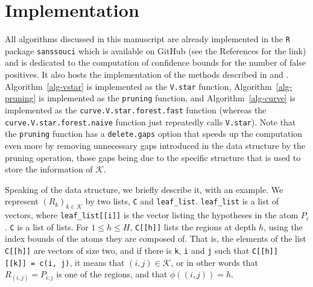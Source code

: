 \documentclass[
  11pt,
  a4paper,
]{article}
\theoremstyle{plain}
\theoremstyle{definition}
\theoremstyle{plain}
\theoremstyle{definition}
\theoremstyle{plain}
\theoremstyle{remark}
\begin{document}
\section{Implementation}\label{sec-implementation}

All algorithms discussed in this manuscript are already implemented in
the \texttt{R} \citep{R-base} package \texttt{sanssouci}
\citep{sanssouci} which is available on GitHub (see the References for
the link) and is dedicated to the computation of confidence bounds for
the number of false positives. It also hosts the implementation of the
methods described in \citet{MR4124323} and
\citet{10.1093/bioinformatics/btac693}.  Algorithm~\ref{alg-vstar}  is
implemented as the \texttt{V.star} function,
 Algorithm~\ref{alg-pruning}  is implemented as the \texttt{pruning}
function, and  Algorithm~\ref{alg-curve}  is implemented as the
\texttt{curve.V.star.forest.fast} function (whereas the
\texttt{curve.V.star.forest.naive} function just repeatedly calls
\texttt{V.star}). Note that the \texttt{pruning} function has a
\texttt{delete.gaps} option that speeds up the computation even more by
removing unnecessary gaps introduced in the data structure by the
pruning operation, those gaps being due to the specific structure that
is used to store the information of \(\mathcal{K}\).

Speaking of the data structure, we briefly describe it, with an example.
We represent \((R_k)_{k\in\mathcal{K}}\) by two lists, \texttt{C} and
\texttt{leaf\_list}. \texttt{leaf\_list} is a list of vectors, where
\texttt{leaf\_list{[}{[}i{]}{]}} is the vector listing the hypotheses in
the atom \(P_i\). \texttt{C} is a list of lists. For \(1\leq h\leq H\),
\texttt{C{[}{[}h{]}{]}} lists the regions at depth \(h\), using the
index bounds of the atoms they are composed of. That is, the elements of
the list \texttt{C{[}{[}h{]}{]}} are vectors of size two, and if there
is \texttt{k}, \texttt{i} and \texttt{j} such that
\texttt{C{[}{[}h{]}{]}{[}{[}k{]}{]}\ =\ c(i,\ j)}, it means that
\((i, j)\in\mathcal{K}\), or in other words that \(R_{(i,j)}=P_{i:j}\)
is one of the regions, and that \(\phi((i, j))=h\).
\end{document}
